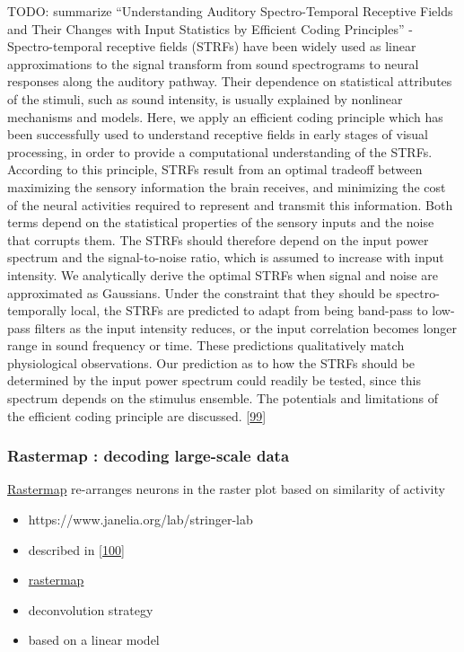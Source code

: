 TODO: summarize ``Understanding Auditory Spectro-Temporal Receptive Fields and Their Changes with Input Statistics by Efficient Coding Principles'' - Spectro-temporal receptive fields (STRFs) have been widely used as linear approximations to the signal transform from sound spectrograms to neural responses along the auditory pathway. Their dependence on statistical attributes of the stimuli, such as sound intensity, is usually explained by nonlinear mechanisms and models. Here, we apply an efficient coding principle which has been successfully used to understand receptive fields in early stages of visual processing, in order to provide a computational understanding of the STRFs. According to this principle, STRFs result from an optimal tradeoff between maximizing the sensory information the brain receives, and minimizing the cost of the neural activities required to represent and transmit this information. Both terms depend on the statistical properties of the sensory inputs and the noise that corrupts them. The STRFs should therefore depend on the input power spectrum and the signal-to-noise ratio, which is assumed to increase with input intensity. We analytically derive the optimal STRFs when signal and noise are approximated as Gaussians. Under the constraint that they should be spectro-temporally local, the STRFs are predicted to adapt from being band-pass to low-pass filters as the input intensity reduces, or the input correlation becomes longer range in sound frequency or time. These predictions qualitatively match physiological observations. Our prediction as to how the STRFs should be determined by the input power spectrum could readily be tested, since this spectrum depends on the stimulus ensemble. The potentials and limitations of the efficient coding principle are discussed.
{[}\protect\hyperlink{ref-s63GcujC}{99}{]}

\hypertarget{rastermap-decoding-large-scale-data}{%
\subsubsection{Rastermap : decoding large-scale data}\label{rastermap-decoding-large-scale-data}}

\href{https://nbviewer.org/github/MouseLand/rastermap/blob/master/tutorial/tutorial.ipynb}{Rastermap} re-arranges neurons in the raster plot based on similarity of activity

\begin{itemize}
\tightlist
\item
  https://www.janelia.org/lab/stringer-lab
\item
  described in {[}\protect\hyperlink{ref-zc16plUu}{100}{]}
\item
  \href{https://github.com/MouseLand/rastermap}{rastermap}
\item
  deconvolution strategy
\item
  based on a linear model
\end{itemize}

